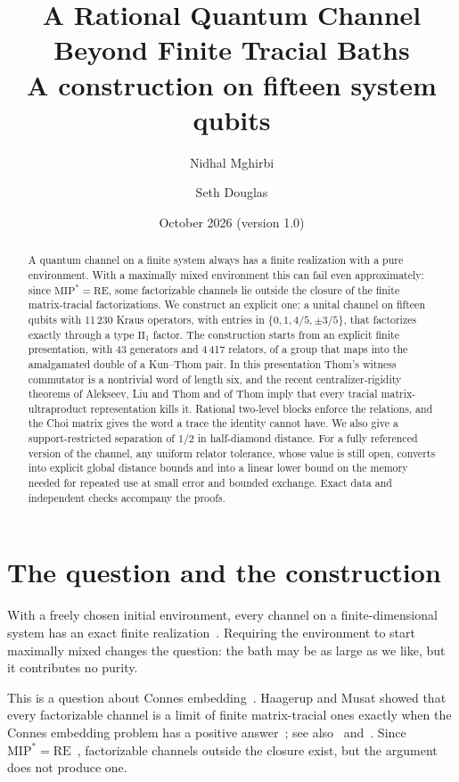 \documentclass[11pt]{article}
\title{A Rational Quantum Channel Beyond Finite Tracial Baths\\[0.3em]
\large A construction on fifteen system qubits}
\author{Nidhal Mghirbi \and Seth Douglas}
\date{October 2026 (version 1.0)}
\begin{document}
\maketitle
\begin{abstract}
A quantum channel on a finite system always has a finite realization with a pure environment.
With a maximally mixed environment this can fail even approximately: since
$\mathrm{MIP}^*=\mathrm{RE}$, some factorizable channels lie outside the closure of the finite
matrix-tracial factorizations. We construct an explicit one: a unital channel on fifteen qubits
with 11\,230 Kraus operators, with entries in $\{0,1,4/5,\pm3/5\}$, that factorizes exactly
through a type $\mathrm{II}_1$ factor. The construction starts from an explicit finite
presentation, with 43 generators and 4\,417 relators, of a group that maps into the
amalgamated double of a Kun--Thom pair. In this presentation Thom's witness commutator is a
nontrivial word of length six, and the recent centralizer-rigidity theorems of Alekseev, Liu
and Thom and of Thom imply that every tracial matrix-ultraproduct representation kills it.
Rational two-level blocks enforce the relations, and the Choi matrix gives the word a trace the
identity cannot have. We also give a support-restricted separation of $1/2$ in half-diamond
distance. For a fully referenced version of the channel, any uniform relator tolerance, whose
value is still open, converts into explicit global distance bounds and into a linear lower
bound on the memory needed for repeated use at small error and bounded exchange. Exact data and
independent checks accompany the proofs.
\end{abstract}

\section{The question and the construction}

With a freely chosen initial environment, every channel on a finite-dimensional system has an
exact finite realization~\cite{stinespring}. Requiring the environment to start maximally
mixed changes the question: the bath may be as large as we like, but it contributes no purity.

This is a question about Connes embedding~\cite{connes,hm11,hm15}. Haagerup and Musat showed
that every factorizable channel is a limit of finite matrix-tracial ones exactly when the
Connes embedding problem has a positive answer~\cite[Theorems~3.6 and~3.7]{hm15}; see
also~\cite[Corollary~3.4]{mr21} and~\cite[Corollary~3.11]{musat}. Since
$\mathrm{MIP}^*=\mathrm{RE}$~\cite{mip}, factorizable channels outside the closure exist, but the
argument does not produce one.
\end{document}
